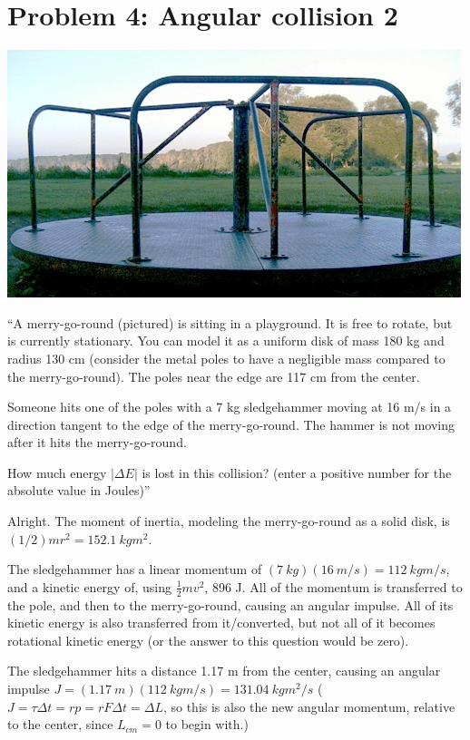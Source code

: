 \documentclass[8.01x]{subfiles}
\begin{document}
\section{Problem 4: Angular collision 2}

\begin{center}
\includegraphics[scale=0.7]{Graphics/midterm3p4}
\end{center}

``A merry-go-round (pictured) is sitting in a playground. It is free to rotate, but is currently stationary. You can model it as a uniform disk of mass 180 kg and radius 130 cm (consider the metal poles to have a negligible mass compared to the merry-go-round). The poles near the edge are 117 cm from the center.

Someone hits one of the poles with a 7 kg sledgehammer moving at 16 m/s in a direction tangent to the edge of the merry-go-round. The hammer is not moving after it hits the merry-go-round.

How much energy $|\Delta E|$ is lost in this collision? (enter a positive number for the absolute value in Joules)''

Alright. The moment of inertia, modeling the merry-go-round as a solid disk, is $(1/2) m r^2 = \SI{152.1}{kg m^2}$. 

The sledgehammer has a linear momentum of $(\SI{7}{kg})(\SI{16}{m/s}) = \SI{112}{kg m/s}$, and a kinetic energy of, using $\displaystyle \frac{1}{2} m v^2$, 896 J. All of the momentum is transferred to the pole, and then to the merry-go-round, causing an angular impulse. All of its kinetic energy is also transferred from it/converted, but not all of it becomes rotational kinetic energy (or the answer to this question would be zero).

The sledgehammer hits a distance 1.17 m from the center, causing an angular impulse $J = (\SI{1.17}{m})(\SI{112}{kg m/s}) = \SI{131.04}{kg m^2/s}$ ($J = \tau \Delta t = r p = r F \Delta t = \Delta L$, so this is also the new angular momentum, relative to the center, since $L_{cm} = 0$ to begin with.)
\end{document}
